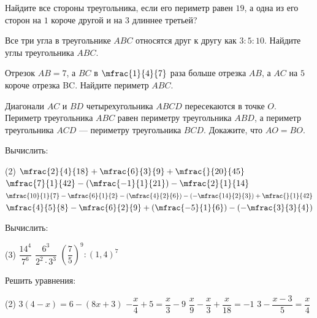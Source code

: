 \begin{exam}
	\begin{listofex}
		\item Найдите все стороны треугольника, если его периметр равен \(19\), а одна из его сторон на \(1\) короче другой и на \(3\) длиннее третьей?
		\item Все три угла в треугольнике \( ABC \) относятся друг к другу как \( 3:5:10 \). Найдите углы треугольника \( ABC \).
		\item Отрезок \( AB=7 \), а \( BC \) в \( \mfrac{1}{4}{7} \) раза больше отрезка \( AB \), а \(AC\) на \(5\) короче отрезка BC. Найдите периметр \( ABC \).
		\item Диагонали \(AC\) и \(BD\) четырехугольника \(ABCD\) пересекаются в точке \(O\). Периметр треугольника \(ABC\) равен периметру треугольника \(ABD\), а периметр треугольника \(ACD\) --- периметру треугольника \(BCD\). Докажите, что \(AO = BO\).
		\item Вычислить:
		\begin{tasks}(2)
			\task \( \mfrac{2}{4}{18}+\mfrac{6}{3}{9}+\mfrac{}{20}{45} \)
			\task \( \mfrac{7}{1}{42}-\left( \mfrac{-1}{1}{21} \right) - \mfrac{2}{1}{14}  \)
			\task \( \mfrac{10}{1}{7}-\mfrac{6}{1}{2}-\left( \mfrac{4}{2}{6} \right)-\left( -\mfrac{14}{2}{3} \right) + \mfrac{}{1}{42} \)
			\task \( \mfrac{4}{5}{8}-\mfrac{6}{2}{9}+\left( \mfrac{-5}{1}{6} \right)-\left( -\mfrac{3}{3}{4} \right) \)
		\end{tasks}
		\item Вычислить:
		\begin{tasks}(3)
			\task \( \dfrac{14^4}{7^6} \)
			\task \( \dfrac{6^3}{2^2\cdot3^3} \)
			\task \( \left( \dfrac{7}{5} \right)^{9}:\left( 1,4 \right)^{7} \)
		\end{tasks}
		\item Решить уравнения:
		\begin{tasks}(2)
			\task \( 3(4-x)=6-(8x+3) \)
			\task \( -\dfrac{x}{4}+5=\dfrac{x}{3}-9 \)
			\task \( \dfrac{x}{9}-\dfrac{x}{3}+\dfrac{x}{18}=-1\)
			\task \( 3-\dfrac{x-3}{5}=\dfrac{x}{4} \)
		\end{tasks}
	\end{listofex}
\end{exam}